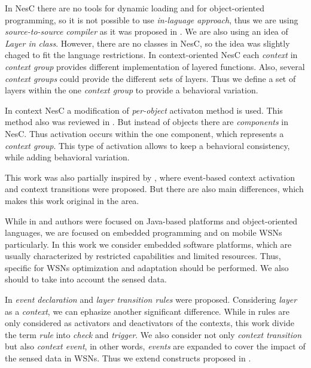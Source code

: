 \documentclass[12pt,a4paper]{article}
\begin{document}
In NesC there are no tools for dynamic loading and for object-oriented programming, so it is not possible to use \textit{in-laguage approach}, thus we are using \textit{source-to-source compiler} as it was proposed in \cite{salvaneschi12}. We are also using an idea of \textit{Layer in class}\cite{salvaneschi12}. However, there are no classes in NesC, so the idea was slightly chaged to fit the language restrictions. In context-oriented NesC each \textit{context} in \textit{context group} provides different implementation of layered functions. Also, several \textit{context groups} could provide the different sets of layers. Thus we define a set of layers within the one \textit{context group} to provide a behavioral variation.

In context NesC a modification of \textit{per-object} activaton method is used. This method also was reviewed in \cite{salvaneschi12}. But instead of objects there are \textit{components} in NesC. Thus activation occurs within the one component, which represents a \textit{context group}. This type of activation allows to keep a behavioral consistency, while adding behavioral variation.

This work was also partially inspired by \cite{kamina11}, where event-based context activation and context transitions were proposed. But there are also main differences, which makes this work original in the area.

While in \cite{kamina11} and \cite{kamina10} authors were focused on Java-based platforms and object-oriented languages, we are focused on embedded programming and on mobile WSNs particularly. In this work we consider embedded software platforms, which are usually characterized by restricted capabilities and limited resources. Thus, specific for WSNs optimization and adaptation should be performed. We also should to take into account the sensed data.

In \cite{kamina11} \textit{event declaration} and \textit{layer transition rules} were proposed. Considering \textit{layer} as a \textit{context}, we can ephasize another significant difference. While in \cite{kamina11} rules are only considered as activators and deactivators of the contexts, this work divide the term \textit{rule} into \textit{check} and \textit{trigger}. We also consider not only \textit{context transition} but also \textit{context event}, in other words, \textit{events} are expanded to cover the impact of the sensed data in WSNs. Thus we extend constructs proposed in \cite{kamina11}.
\end{document}
